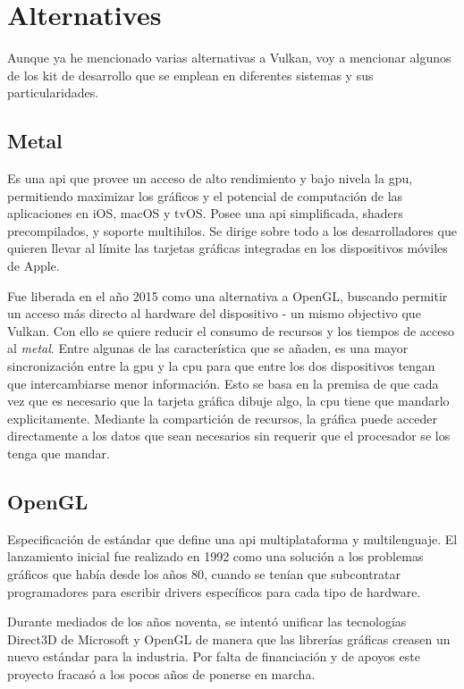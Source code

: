 \chapter{Alternatives}
Aunque ya he mencionado varias alternativas a Vulkan, voy a mencionar algunos de los kit de desarrollo que se emplean
en diferentes sistemas y sus particularidades.

\section{Metal}
Es una \gls{api} que provee un acceso de alto rendimiento y bajo nivela la \gls{gpu}, permitiendo maximizar los
gráficos y el potencial de computación de las aplicaciones en iOS, macOS y tvOS. Posee una \gls{api} simplificada,
shaders precompilados, y soporte multihilos. Se dirige sobre todo a los desarrolladores que quieren llevar al límite
las tarjetas gráficas integradas en los dispositivos móviles de Apple.

Fue liberada en el año 2015 como una alternativa a OpenGL, buscando permitir un acceso más directo al hardware del
dispositivo - un mismo objectivo que Vulkan. Con ello se quiere reducir el consumo de recursos y los tiempos de
acceso al \emph{metal}. Entre algunas de las característica que se añaden, es una mayor sincronización entre la
\gls{gpu} y la \gls{cpu} para que entre los dos dispositivos tengan que intercambiarse menor información. Esto se basa
en la premisa de que cada vez que es necesario que la tarjeta gráfica dibuje algo, la \gls{cpu} tiene que mandarlo
explicitamente. Mediante la compartición de recursos, la gráfica puede acceder directamente a los datos que sean
necesarios sin requerir que el procesador se los tenga que mandar.

\section{OpenGL}
Especificación de estándar que define una \gls{api} multiplataforma y multilenguaje. El lanzamiento inicial fue
realizado en 1992 como una solución a los problemas gráficos que había desde los años 80, cuando se tenían que
subcontratar programadores para escribir drivers específicos para cada tipo de hardware.

Durante mediados de los años noventa, se intentó unificar las tecnologías Direct3D de Microsoft y OpenGL de manera
que las librerías gráficas creasen un nuevo estándar para la industria. Por falta de financiación y de apoyos este
proyecto fracasó a los pocos años de ponerse en marcha.

